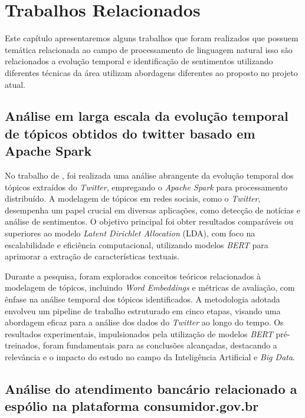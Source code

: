 \chapter{Trabalhos Relacionados}
\label{cap:trabalhos_relacionados}

Este capítulo apresentaremos alguns trabalhos que foram realizados que possuem temática relacionada ao campo de processamento de linguagem natural isso são relacionados a evolução temporal e identificação de sentimentos utilizando diferentes técnicas da área utilizam abordagens diferentes ao proposto no projeto atual.

\section{Análise em larga escala da evolução temporal de tópicos obtidos do twitter basado em Apache Spark}
\label{cap:trabalhos_relacionados:sec:braulio}

No trabalho de , foi realizada uma análise abrangente da evolução temporal dos tópicos extraídos do \textit{Twitter}, empregando o \textit{Apache Spark} para processamento distribuído. A modelagem de tópicos em redes sociais, como o \textit{Twitter}, desempenha um papel crucial em diversas aplicações, como detecção de notícias e análise de sentimentos. O objetivo principal foi obter resultados comparáveis ou superiores ao modelo \textit{Latent Dirichlet Allocation} (LDA), com foco na escalabilidade e eficiência computacional, utilizando modelos \textit{BERT} para aprimorar a extração de características textuais.

Durante a pesquisa, foram explorados conceitos teóricos relacionados à modelagem de tópicos, incluindo \textit{Word Embeddings} e métricas de avaliação, com ênfase na análise temporal dos tópicos identificados. A metodologia adotada envolveu um pipeline de trabalho estruturado em cinco etapas, visando uma abordagem eficaz para a análise dos dados do \textit{Twitter} ao longo do tempo. Os resultados experimentais, impulsionados pela utilização de modelos \textit{BERT} pré-treinados, foram fundamentais para as conclusões alcançadas, destacando a relevância e o impacto do estudo no campo da Inteligência Artificial e \textit{Big Data}.


\section{Análise do atendimento bancário relacionado a espólio na plataforma consumidor.gov.br}
\label{cap:trabalhos_relacionados:sec:desterro}

